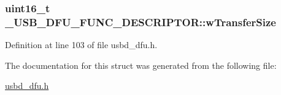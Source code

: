 \subsubsection[{\texorpdfstring{w\+Transfer\+Size}{wTransferSize}}]{\setlength{\rightskip}{0pt plus 5cm}uint16\+\_\+t \+\_\+\+U\+S\+B\+\_\+\+D\+F\+U\+\_\+\+F\+U\+N\+C\+\_\+\+D\+E\+S\+C\+R\+I\+P\+T\+O\+R\+::w\+Transfer\+Size}\hypertarget{struct__USB__DFU__FUNC__DESCRIPTOR_aa2d15000591e2a01b63bc46e53dde84a}{}\label{struct__USB__DFU__FUNC__DESCRIPTOR_aa2d15000591e2a01b63bc46e53dde84a}


Definition at line 103 of file usbd\+\_\+dfu.\+h.



The documentation for this struct was generated from the following file\+:\begin{DoxyCompactItemize}
\item 
\hyperlink{usbd__dfu_8h}{usbd\+\_\+dfu.\+h}\end{DoxyCompactItemize}
